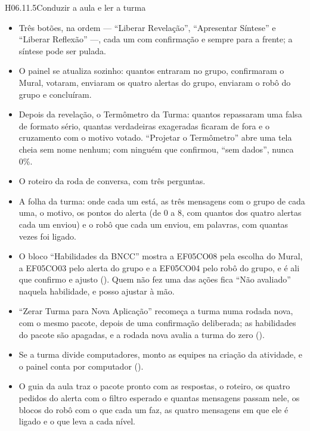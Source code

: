\begin{historia}{H06.11.5}{Conduzir a aula e ler a turma}{\parcial}
\aceite
\begin{itemize}
  \item Três botões, na ordem --- \enquote{Liberar Revelação},
    \enquote{Apresentar Síntese} e \enquote{Liberar Reflexão} ---, cada um com
    confirmação e sempre para a frente; a síntese pode ser pulada.
  \item O painel se atualiza sozinho: quantos entraram no grupo, confirmaram o
    Mural, votaram, enviaram os quatro alertas do grupo, enviaram o robô do
    grupo e concluíram.
  \item Depois da revelação, o Termômetro da Turma: quantos repassaram uma
    falsa de formato sério, quantas verdadeiras exageradas ficaram de fora e o
    cruzamento com o motivo votado. \enquote{Projetar o Termômetro} abre uma
    tela cheia sem nome nenhum; com ninguém que confirmou, \enquote{sem dados},
    nunca 0\%.
  \item O roteiro da roda de conversa, com três perguntas.
  \item A folha da turma: onde cada um está, as três mensagens com o grupo de
    cada uma, o motivo, os pontos do alerta (de 0 a 8, com quantos dos quatro
    alertas cada um enviou) e o robô que cada um enviou, em palavras, com
    quantas vezes foi ligado.
  \item O bloco \enquote{Habilidades da BNCC} mostra a EF05CO08 pela escolha do
    Mural, a EF05CO03 pelo alerta do grupo e a EF05CO04 pelo robô do grupo, e é
    ali que confirmo e ajusto (). Quem não fez uma das ações fica
    \enquote{Não avaliado} naquela habilidade, e posso ajustar à mão.
  \item \enquote{Zerar Turma para Nova Aplicação} recomeça a turma numa rodada
    nova, com o mesmo pacote, depois de uma confirmação deliberada; as
    habilidades do pacote são apagadas, e a rodada nova avalia a turma do zero
    ().
  \item Se a turma divide computadores, monto as equipes na criação da
    atividade, e o painel conta por computador ().
  \item O guia da aula traz o pacote pronto com as respostas, o roteiro, os
    quatro pedidos do alerta com o filtro esperado e quantas mensagens passam
    nele, os blocos do robô com o que cada um faz, as quatro mensagens em que
    ele é ligado e o que leva a cada nível.
\end{itemize}
\end{historia}

